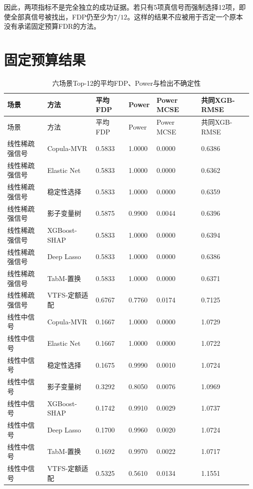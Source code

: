 \documentclass{sufethesismas}
\begin{document}
因此，两项指标不是完全独立的成功证据。若只有5项真信号而强制选择12项，即使全部真信号被找出，FDP仍至少为\(7/12\)。这样的结果不应被用于否定一个原本没有承诺固定预算FDR的方法。

\section{固定预算结果}

{
\footnotesize
\begin{longtable}[]{@{}llllll@{}}
\caption{六场景Top-12的平均FDP、Power与检出不确定性}\tabularnewline
\toprule\noalign{}
场景 & 方法 & 平均FDP & Power & Power MCSE & 共同XGB-RMSE \\
\midrule\noalign{}
\endfirsthead
\toprule\noalign{}
场景 & 方法 & 平均FDP & Power & Power MCSE & 共同XGB-RMSE \\
\midrule\noalign{}
\endhead
\bottomrule\noalign{}
\endlastfoot
线性稀疏强信号 & Copula-MVR & 0.5833 & 1.0000 & 0.0000 & 0.6386 \\
线性稀疏强信号 & Elastic Net & 0.5833 & 1.0000 & 0.0000 & 0.6362 \\
线性稀疏强信号 & 稳定性选择 & 0.5833 & 1.0000 & 0.0000 & 0.6359 \\
线性稀疏强信号 & 影子变量树 & 0.5875 & 0.9900 & 0.0044 & 0.6396 \\
线性稀疏强信号 & XGBoost-SHAP & 0.5833 & 1.0000 & 0.0000 & 0.6394 \\
线性稀疏强信号 & Deep Lasso & 0.5833 & 1.0000 & 0.0000 & 0.6386 \\
线性稀疏强信号 & TabM-置换 & 0.5833 & 1.0000 & 0.0000 & 0.6371 \\
线性稀疏强信号 & VTFS-定额适配 & 0.6767 & 0.7760 & 0.0174 & 0.7125 \\
线性中信号 & Copula-MVR & 0.1667 & 1.0000 & 0.0000 & 1.0729 \\
线性中信号 & Elastic Net & 0.1667 & 1.0000 & 0.0000 & 1.0722 \\
线性中信号 & 稳定性选择 & 0.1675 & 0.9990 & 0.0010 & 1.0724 \\
线性中信号 & 影子变量树 & 0.3292 & 0.8050 & 0.0076 & 1.0969 \\
线性中信号 & XGBoost-SHAP & 0.1742 & 0.9910 & 0.0029 & 1.0737 \\
线性中信号 & Deep Lasso & 0.1700 & 0.9960 & 0.0020 & 1.0724 \\
线性中信号 & TabM-置换 & 0.1692 & 0.9970 & 0.0022 & 1.0717 \\
线性中信号 & VTFS-定额适配 & 0.5325 & 0.5610 & 0.0134 & 1.1551 \\

\end{longtable}}
\end{document}

